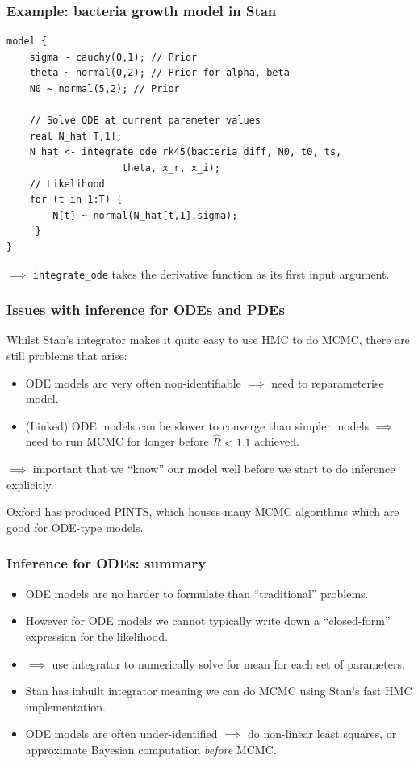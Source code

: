 \documentclass[handout]{beamer}
\begin{document}
\begin{frame}[fragile]
	\frametitle{Example: bacteria growth model in Stan}
	
\begin{verbatim}
model {
    sigma ~ cauchy(0,1); // Prior
    theta ~ normal(0,2); // Prior for alpha, beta
    N0 ~ normal(5,2); // Prior
    
    // Solve ODE at current parameter values
    real N_hat[T,1];
    N_hat <- integrate_ode_rk45(bacteria_diff, N0, t0, ts, 
                    theta, x_r, x_i);
    // Likelihood
    for (t in 1:T) {
        N[t] ~ normal(N_hat[t,1],sigma);
     }
}
\end{verbatim}

$\implies$ \texttt{integrate_ode} takes the derivative function as its first input argument. 

\end{frame}

\begin{frame}
	\frametitle{Issues with inference for ODEs and PDEs}
	 Whilst Stan's integrator makes it quite easy to use HMC to do MCMC, there are still problems that arise:
	\begin{itemize}
		\item<3-> ODE models are very often non-identifiable $\implies$ need to reparameterise model.
		\item<4-> (Linked) ODE models can be slower to converge than simpler models $\implies$ need to run MCMC for longer before $\hat{R}<1.1$ achieved.
	\end{itemize}
	
	$\implies$ important that we ``know'' our model well before we start to do inference explicitly.

 \vspace{0.5cm}

  Oxford has produced PINTS, which houses many MCMC algorithms which are good for ODE-type models.
	
\end{frame}


\begin{frame}
	\frametitle{Inference for ODEs: summary}
	\begin{itemize}
		\item<2-> ODE models are no harder to formulate than ``traditional'' problems.
		\item<3-> However for ODE models we cannot typically write down a ``closed-form'' expression for the likelihood.
		\item<4-> $\implies$ use integrator to numerically solve for mean for each set of parameters.
		\item<5-> Stan has inbuilt integrator meaning we can do MCMC using Stan's fast HMC implementation.
		\item<6-> ODE models are often under-identified $\implies$ do non-linear least squares, or approximate Bayesian computation \textit{before} MCMC.
	\end{itemize}
	
\end{frame}
\end{document}
